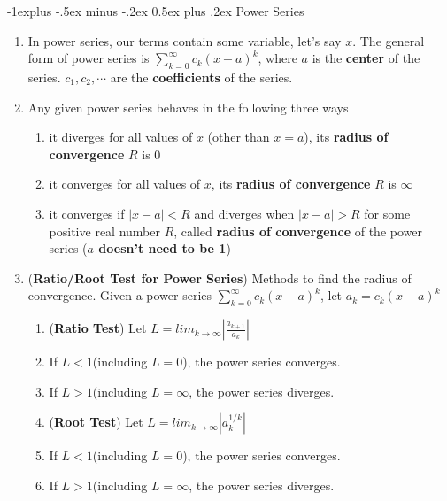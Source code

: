 \documentclass[10pt, landscape]{article}
\makeatletter
\renewcommand{\subsection}{\@startsection{subsection}{2}{0mm}%
                                {-1explus -.5ex minus -.2ex}%
                                {0.5ex plus .2ex}%
                                {\normalfont\normalsize\bfseries}}
\makeatother
\begin{document}
\begin{multicols}{4}
\subsection{Power Series}
\begin{enumerate}
    \item In power series, our terms contain some variable, let's say $x$. The general form of power series is $\sum_{k=0}^{\infty}c_k(x-a)^k$, where $a$ is the \textbf{center} of the series. $c_1, c_2, \cdots$ are the \textbf{coefficients} of the series.
    \item Any given power series behaves in the following three ways
    \begin{enumerate}
        \item it diverges for all values of $x$ (other than $x=a$), its \textbf{radius of convergence} $R$ is $0$
        \item it converges for all values of $x$, its \textbf{radius of convergence} $R$ is $\infty$
        \item it converges if $|x-a|<R$ and diverges when $|x-a|>R$ for some positive real number $R$, called \textbf{radius of convergence} of the power series (\textbf{$a$ doesn't need to be 1})
    \end{enumerate}
    \item (\textbf{Ratio/Root Test for Power Series}) Methods to find the radius of convergence. Given a power series $\sum_{k=0}^{\infty}c_k(x-a)^k$, let $a_k=c_k(x-a)^k$
    \begin{enumerate}
        \item (\textbf{Ratio Test}) Let $L=lim_{k\to \infty}|\frac{a_{k+1}}{a_k}|$
        \item If $L < 1$(including $L=0$), the power series converges.
        \item If $L > 1$(including $L=\infty$, the power series diverges.
        \item (\textbf{Root Test}) Let $L=lim_{k\to \infty}|a_k^{1/k}|$
        \item If $L < 1$(including $L=0$), the power series converges.
        \item If $L > 1$(including $L=\infty$, the power series diverges.
    \end{enumerate}
\end{enumerate}


\end{multicols}
\end{document}
